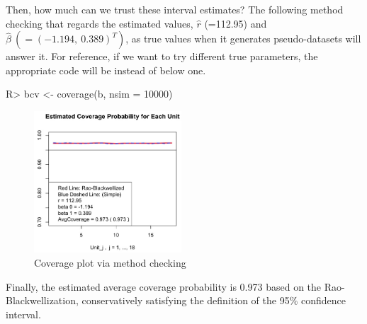 \documentclass[article]{jss}
\begin{document}
Then, how much can we trust these interval estimates? The following method checking that regards the estimated values, $\hat{r}$ (=112.95) and $\hat{\beta}~(=(-1.194, ~0.389)^{T})$, as true values when it generates pseudo-datasets will answer it. For reference, if we want to try different true parameters, the appropriate code will be  instead of below one.

\begin{CodeChunk}
\begin{CodeInput}
R> bcv <- coverage(b, nsim = 10000)
\end{CodeInput}
\end{CodeChunk}
\begin{figure}[h]
\begin{center}
\includegraphics[width = 5.5cm]{baseball2.png}
\caption{Coverage plot via method checking}
\end{center}
\end{figure}

Finally, the estimated average coverage probability is 0.973 based on the Rao-Blackwellization, conservatively satisfying the definition of the 95\% confidence interval. 



\end{document}
